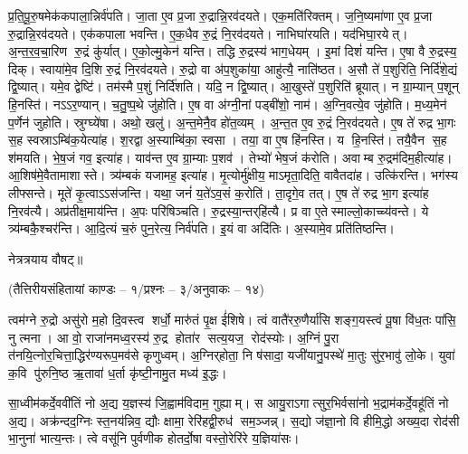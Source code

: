 प्र॒ति॒पू॒रु॒षमेक॑कपाला॒न्निर्व॑पति। जा॒ता ए॒व प्र॒जा रु॒द्रान्नि॒रव॑दयते। एक॒मति॑रिक्तम्। ज॒नि॒ष्यमा॑णा ए॒व प्र॒जा रु॒द्रान्नि॒रव॑दयते। एक॑कपाला भवन्ति। ए॒क॒धैव रु॒द्रं नि॒रव॑दयते। नाभिघा॑रयति। यद॑भिघा॒रयेत्। अ॒न्त॒र॒व॒चा॒रिण रु॒द्रं कु॑र्यात्। ए॒को॒ल्मु॒केन॑ यन्ति। 
तद्धि रु॒द्रस्य॑ भाग॒धेयम्। इ॒मां दिशं॑ यन्ति। ए॒षा वै रु॒द्रस्य॒ दिक्। स्वाया॑मे॒व दि॒शि रु॒द्रं नि॒रव॑दयते। रु॒द्रो वा अ॑प॒शुका॑या॒ आहु॑त्यै॒ नाति॑ष्ठत। अ॒सौ ते॑ प॒शुरिति॒ निर्दि॑शे॒द्यं द्वि॒ष्यात्। यमे॒व द्वेष्टि॑। तम॑स्मै प॒शुं निर्दि॑शति। यदि॒ न द्वि॒ष्यात्। आ॒खुस्ते॑ प॒शुरिति॑ ब्रूयात्। 
न ग्रा॒म्यान् प॒शून् हि॒नस्ति॑। नऽऽर॒ण्यान्। च॒तु॒ष्प॒थे जु॑होति। ए॒ष वा अ॑ग्नी॒नां पड्बी॑शो॒ नाम॑। अ॒ग्नि॒वत्ये॒व जु॑होति। म॒ध्य॒मेन॑ प॒र्णेन॑ जुहोति। स्रुग्घ्ये॑षा। अथो॒ खलु॑। अ॒न्त॒मेनै॒व हो॑त॒व्यम्। अ॒न्त॒त ए॒व रु॒द्रं नि॒रव॑दयते। 
ए॒ष ते॑ रुद्र भा॒गः स॒ह स्वस्राऽम्बि॑क॒येत्या॑ह। श॒रद्वा अ॒स्याम्बि॑का॒ स्वसा। तया॒ वा ए॒ष हि॑नस्ति। य हि॒नस्ति॑। तयै॒वैन स॒ह श॑मयति। भे॒ष॒जं गव॒ इत्या॑ह। याव॑न्त ए॒व ग्रा॒म्याः प॒शव॑। तेभ्यो॑ भेष॒जं क॑रोति। अवाम्ब रु॒द्रम॑दिम॒हीत्या॑ह। आ॒शिष॑मे॒वैतामाशास्ते। 
त्र्य॑म्बकं यजामह॒ इत्या॑ह। मृ॒त्योर्मु॑क्षीय॒ माऽमृता॒दिति॒ वावैतदा॑ह। उत्कि॑रन्ति। भग॑स्य लीफ्सन्ते। मूते॑ कृ॒त्वाऽऽस॑जन्ति। यथा॒ जनं॑ य॒ते॑ऽव॒सं क॒रोति॑। ता॒दृगे॒व तत्। ए॒ष ते॑ रुद्र भा॒ग इत्या॑ह नि॒रव॑त्यै। अप्र॑तीक्ष॒माय॑न्ति। अ॒पः परि॑षिञ्चति। \mbox{रु॒द्रस्या॒न्तर्‌\mbox{}\hspace{-0.5ex}हि॑त्यै}। प्र वा ए॒तेस्माल्लो॒काच्च्य॑वन्ते। ये त्र्य॑म्बकै॒श्चर॑न्ति। आ॒दि॒त्यं च॒रुं पुन॒रेत्य॒ निर्व॑पति। इ॒यं वा अदि॑तिः। अ॒स्यामे॒व प्रति॑तिष्ठन्ति। 

नेत्रत्रयाय वौषट्॥

{\small \closesection}



{}
\centerline{\normalsize (तैत्तिरीयसंहितायां काण्डः – १/प्रश्नः – ३/अनुवाकः – १४)}

त्वम॑ग्ने रु॒द्रो असु॑रो म॒हो दि॒वस्त्व शर्धो॒ मारु॑तं पृ॒क्ष ई॑शिषे। त्वं वातै॑ररु॒णैर्या॑सि शङ्ग॒यस्त्वं पू॒षा वि॑ध॒तः पा॑सि॒ नु त्मना।
आ वो॒ राजा॑नमध्व॒रस्य॑ रु॒द्र होता॑र सत्य॒यज॒ रोद॑स्योः। अ॒ग्निं पु॒रा त॑नयि॒त्नोर॒चित्ता॒द्धिर॑ण्यरूप॒मव॑से कृणुध्वम्। अ॒ग्निर्‌होता॒ नि ष॑सादा॒ यजी॑यानु॒पस्थे॑ मा॒तुः सु॑र॒भावु॑ लो॒के। युवा॑ क॒वि पु॑रुनि॒ष्ठ ऋ॒तावा॑ ध॒र्ता कृ॑ष्टी॒नामु॒त मध्य॑ इ॒द्धः। 

सा॒ध्वीम॑कर्दे॒ववी॑तिं नो अ॒द्य य॒ज्ञस्य॑ जि॒ह्वाम॑विदाम॒ गुह्याम्। स आयु॒राऽगात्सुर॒भिर्वसा॑नो भ॒द्राम॑कर्दे॒वहू॑तिं नो अ॒द्य। अक्र॑न्दद॒ग्निः स्त॒नय॑न्निव॒ द्यौः क्षामा॒ रेरि॑हद्वी॒रुध॑ सम॒ञ्जन्न्। स॒द्यो ज॑ज्ञा॒नो वि हीमि॒द्धो अख्य॒दा रोद॑सी भा॒नुना॑ भात्य॒न्तः। त्वे वसू॑नि पुर्वणीक होतर्दो॒षा वस्तो॒रेरि॑रे य॒ज्ञिया॑सः। 

